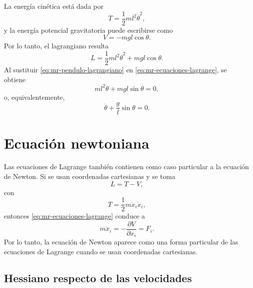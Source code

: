 \documentclass[../apunte_mecanica_clasica.tex]{subfiles}%
\begin{document}
La energía cinética está dada por
\begin{equation}
    T=\frac{1}{2}m l^2\dot\theta^2,
    \label{eq:mr-pendulo-energia-cinetica}
\end{equation}
y la energía potencial gravitatoria puede escribirse como
\begin{equation}
    V=-mgl\cos\theta.
    \label{eq:mr-pendulo-potencial}
\end{equation}
Por lo tanto, el lagrangiano resulta
\begin{equation}
    L=\frac{1}{2}m l^2\dot\theta^2+mgl\cos\theta.
    \label{eq:mr-pendulo-lagrangiano}
\end{equation}
Al sustituir \eqref{eq:mr-pendulo-lagrangiano} en \eqref{eq:mr-ecuaciones-lagrange}, se obtiene
\begin{equation}
    ml^2\ddot\theta + mgl\sin\theta=0,
    \label{eq:mr-pendulo-ecuacion-movimiento}
\end{equation}
o, equivalentemente,
\begin{equation}
    \ddot\theta+\frac{g}{l}\sin\theta=0.
    \label{eq:mr-pendulo-no-lineal}
\end{equation}

\section{Ecuación newtoniana}
\label{sec:mr-ecuacion-newtoniana}

Las ecuaciones de Lagrange también contienen como caso particular a la ecuación de Newton. Si se usan coordenadas cartesianas y se toma
\begin{equation}
    L=T-V,
    \label{eq:mr-lagrangiano-cartesiano}
\end{equation}
con
\begin{equation}
    T=\frac{1}{2}m\dot x_i\dot x_i,
    \label{eq:mr-cinetica-cartesiana}
\end{equation}
entonces \eqref{eq:mr-ecuaciones-lagrange} conduce a
\begin{equation}
    m\ddot x_i=-\frac{\partial V}{\partial x_i}=F_i.
    \label{eq:mr-newton-desde-lagrange}
\end{equation}
Por lo tanto, la ecuación de Newton aparece como una forma particular de las ecuaciones de Lagrange cuando se usan coordenadas cartesianas.

\subsection{Hessiano respecto de las velocidades}
\label{subsec:mr-hessiano-velocidades}
\end{document}

